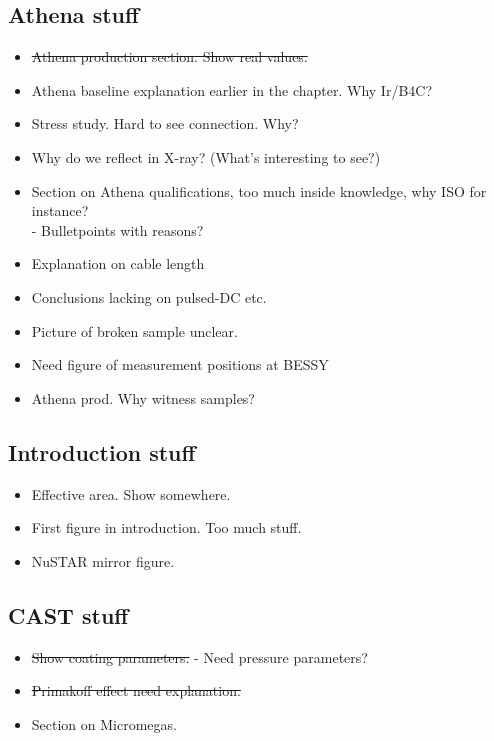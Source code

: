 \subsection{Athena stuff}
\begin{itemize}

	\item \st{ Athena production section. Show real values.}
	\item Athena baseline explanation earlier in the chapter. Why Ir/B4C?
	\item Stress study. Hard to see connection. Why?


	\item Why do we reflect in X-ray? (What's interesting to see?)
	\item Section on Athena qualifications, too much inside knowledge, why ISO for instance?\\
         - Bulletpoints with reasons?

	\item Explanation on cable length
	\item Conclusions lacking on pulsed-DC etc.
	\item Picture of broken sample unclear.
	\item Need figure of measurement positions at BESSY
	\item Athena prod. Why witness samples?

\end{itemize}

\subsection{Introduction stuff}
\begin{itemize}
  \item Effective area. Show somewhere.
  \item First figure in introduction. Too much stuff.
  \item NuSTAR mirror figure.



\end{itemize}


\subsection{CAST stuff}
\begin{itemize}
  \item \st{ Show coating parameters.}
      - Need pressure parameters?
  \item \st {Primakoff effect need explanation.}
  \item Section on Micromegas.
\end{itemize}

